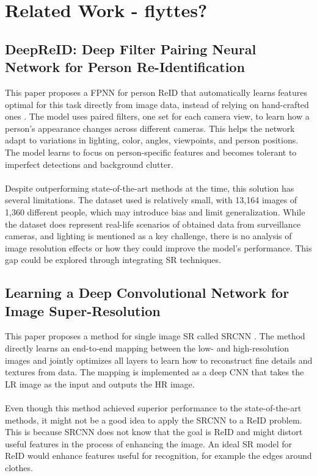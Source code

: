 \section{Related Work - flyttes?}

\subsection{DeepReID: Deep Filter Pairing Neural Network for Person Re-Identification}

This paper proposes a \ac{FPNN} for person \ac{ReID} that automatically learns features optimal for this task directly from image data, instead of relying on hand-crafted ones \cite{FPNN}. The model uses paired filters, one set for each camera view, to learn how a person’s appearance changes across different cameras. This helps the network adapt to variations in lighting, color, angles, viewpoints, and person positions. The model learns to focus on person-specific features and becomes tolerant to imperfect detections and background clutter. 
\\\\
Despite outperforming state-of-the-art methods at the time, this solution has several limitations. The dataset used is relatively small, with 13,164 images of 1,360 different people, which may introduce bias and limit generalization. While the dataset does represent real-life scenarios of obtained data from surveillance cameras, and lighting is mentioned as a key challenge, there is no analysis of image resolution effects or how they could improve the model’s performance. This gap could be explored through integrating \ac{SR} techniques.  

\subsection{Learning a Deep Convolutional Network for Image Super-Resolution}

This paper proposes a method for single image \ac{SR} called \ac{SRCNN} \cite{SRCNN}. The method directly learns an end-to-end mapping between the low- and high-resolution images and jointly optimizes all layers to learn how to reconstruct fine details and textures from data. The mapping is implemented as a deep \ac{CNN} that takes the \ac{LR} image as the input and outputs the \ac{HR} image.
\\\\
Even though this method achieved superior performance to the state-of-the-art methods, it might not be a good idea to apply the \ac{SRCNN} to a \ac{ReID} problem. This is because \ac{SRCNN} does not know that the goal is \ac{ReID} and might distort useful features in the process of enhancing the image. An ideal \ac{SR} model for \ac{ReID} would enhance features useful for recognition, for example the edges around clothes. 	

